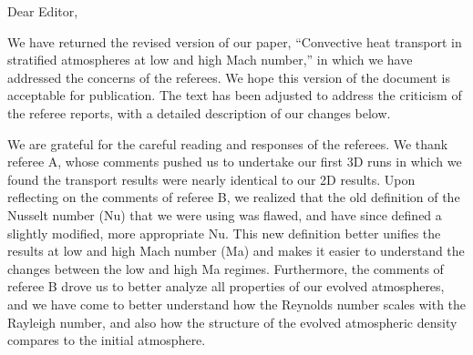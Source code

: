 \documentclass[aps, 11pt, singlecolumn]{revtex4-1} %
\begin{document}
\noindent
Dear Editor,
$\,$\newline

\newenvironment{myquotation}{
\begin{quotation}
\itshape
}{ 
\end{quotation}
}

\begin{singlespace}
We have returned the revised version of our paper, 
``Convective heat transport in stratified atmospheres at low and high
Mach number,'' in which we have addressed the concerns of the referees.
We hope this version of the document is acceptable for publication.  The text 
has been adjusted to address the criticism of the referee reports,
with a detailed description of our changes below.

We are grateful for the careful reading and responses of the referees.  
We thank referee A, whose
comments pushed us to undertake our first 3D runs in which we found the
transport results were nearly identical to our 2D results.
Upon reflecting on the
comments of referee B, we realized that the old definition of the
Nusselt number (Nu) that we were using was flawed, and have since defined
a slightly modified, more appropriate Nu.  This new definition better unifies
the results at low and high Mach number (Ma) and makes it easier to understand
the changes between the low and high Ma regimes.  Furthermore, 
the comments of referee B drove us to better analyze all properties of our evolved
atmospheres, and we have come to better understand how the Reynolds number scales with
the Rayleigh number, and also how the structure of the evolved atmospheric density
compares to the initial atmosphere.


\end{singlespace}
\end{document}
